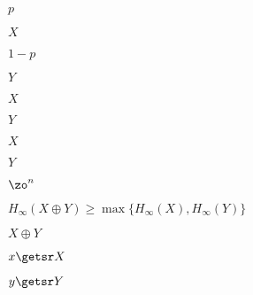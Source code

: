 \documentclass[10pt]{book}
\begin{document}
\begin{mdSnippets}
\begin{mdInlineSnippet}[83878c91171338902e0fe0fb97a8c47a]%
$p$\end{mdInlineSnippet}%
\begin{mdInlineSnippet}[02129bb861061d1a052c592e2dc6b383]%
$X$\end{mdInlineSnippet}%
\begin{mdInlineSnippet}[31bf5573d0f26d8e8a21c347fac3c80e]%
$1-p$\end{mdInlineSnippet}%
\begin{mdInlineSnippet}[57cec4137b614c87cb4e24a3d003a3e0]%
$Y$\end{mdInlineSnippet}%
\begin{mdInlineSnippet}[02129bb861061d1a052c592e2dc6b383]%
$X$\end{mdInlineSnippet}%
\begin{mdInlineSnippet}[57cec4137b614c87cb4e24a3d003a3e0]%
$Y$\end{mdInlineSnippet}%
\begin{mdInlineSnippet}[02129bb861061d1a052c592e2dc6b383]%
$X$\end{mdInlineSnippet}%
\begin{mdInlineSnippet}[57cec4137b614c87cb4e24a3d003a3e0]%
$Y$\end{mdInlineSnippet}%
\begin{mdInlineSnippet}[5867c9b098884eca2779f6d98d4b0b29]%
$\zo^n$\end{mdInlineSnippet}%
\begin{mdInlineSnippet}%
$H_{\infty}(X \oplus Y) \geq \max \{ H_{\infty}(X) , H_{\infty}(Y) \}$\end{mdInlineSnippet}%
\begin{mdInlineSnippet}%
$X\oplus Y$\end{mdInlineSnippet}%
\begin{mdInlineSnippet}[96eb03a6e185092bf6157c8d9516ad5e]%
$x\getsr X$\end{mdInlineSnippet}%
\begin{mdInlineSnippet}[01f76e562747b02b19054dc83c792eea]%
$y\getsr Y$\end{mdInlineSnippet}%

\end{mdSnippets}
\end{document}
